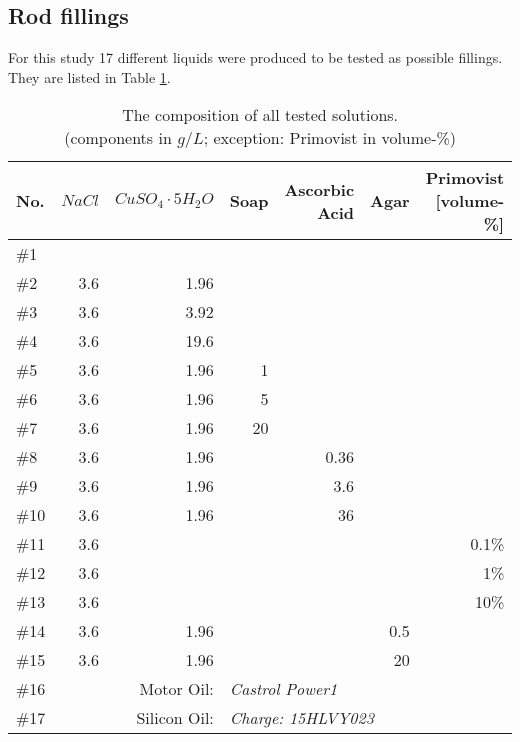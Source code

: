 \clearpage

\subsection{Rod fillings}

For this study 17 different liquids were produced to be tested as possible fillings.
They are listed in Table \ref{tab:solutions}.


\begin{table}[!hbt]
\centering
\begin{tabular}{@{}l|rrrrrr@{}}
No.   & $NaCl$   & $CuSO_4\cdot5H_2O$          & Soap & Ascorbic Acid & Agar & Primovist [volume-\%]\\
\toprule
\#1  &             &                   &      &               &           &		\\
\#2  & 3.6         & 1.96              &      &               &           &		\\
\#3  & 3.6         & 3.92              &      &               &           &		\\
\#4  & 3.6         & 19.6              &      &               &           &		\\
\#5  & 3.6         & 1.96              & 1    &               &           &		\\
\#6  & 3.6         & 1.96              & 5    &               &           &		\\
\#7  & 3.6         & 1.96              & 20   &               &           &		\\
\#8  & 3.6         & 1.96              &      & 0.36          &           &		\\
\#9  & 3.6         & 1.96              &      & 3.6           &           &		\\
\#10 & 3.6         & 1.96              &      & 36            &           &		\\
\#11 & 3.6         &                   &      &               &           & 0.1\%	\\
\#12 & 3.6         &                   &      &               &           & 1\%		\\
\#13 & 3.6         &                   &      &               &           & 10\%	\\
\#14 & 3.6         & 1.96              &      &               &  0.5      &		\\
\#15 & 3.6         & 1.96              &      &               &   20      &		\\
\midrule
\#16 & \multicolumn{2}{r}{Motor Oil:}   & \multicolumn{4}{l}{\textit{Castrol Power1}}      \\
\#17 & \multicolumn{2}{r}{Silicon Oil:} & \multicolumn{4}{l}{\textit{Charge: 15HLVY023}}   \\ \bottomrule
\end{tabular}
\caption{The composition of all tested solutions.\\(components in $g/L$; exception: Primovist in volume-\%)}
\label{tab:solutions}
\end{table}

